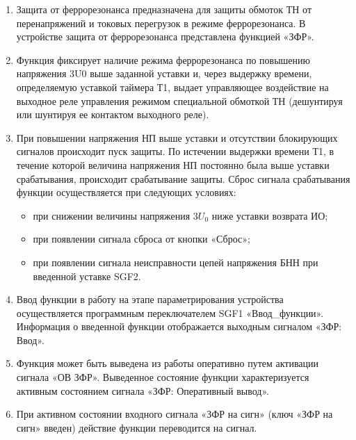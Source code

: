 
\color{black}

\begin{enumerate}

\item
Защита от феррорезонанса предназначена для защиты обмоток ТН от перенапряжений и токовых перегрузок в режиме феррорезонанса. В устройстве защита от феррорезонанса представлена функцией «ЗФР».

\item
Функция фиксирует наличие режима феррорезонанса по повышению напряжения 3U0 выше заданной уставки и, через выдержку времени, определяемую уставкой таймера Т1, выдает управляющее воздействие на выходное реле управления режимом специальной обмоткой ТН (дешунтируя или шунтируя ее контактом выходного реле).

\item
При повышении напряжения НП выше уставки и отсутствии блокирующих сигналов происходит пуск защиты. По истечении выдержки времени Т1, в течение которой величина напряжения НП постоянно была выше уставки срабатывания, происходит срабатывание защиты. Сброс сигнала срабатывания функции осуществляется при следующих условиях:
\begin{itemize}
    \item	при снижении величины напряжения $3U_0$ ниже уставки возврата ИО;
    \item	при появлении сигнала сброса от кнопки «Сброс»;
    \item	при появлении сигнала неисправности цепей напряжения БНН при введенной уставке SGF2.
\end{itemize}

\item
Ввод функции в работу на этапе параметрирования устройства осуществляется программным переключателем SGF1 «Ввод\_функции». Информация о введенной функции отображается выходным сигналом «ЗФР: Ввод».

\item\sloppy
Функция может быть выведена из работы оперативно путем активации сигнала «ОВ ЗФР». Выведенное состояние функции характеризуется активным состоянием сигнала «ЗФР: Оперативный вывод».

\item
При активном состоянии входного сигнала «ЗФР на сигн» (ключ «ЗФР на сигн» введен) действие функции переводится на сигнал.


\end{enumerate}
